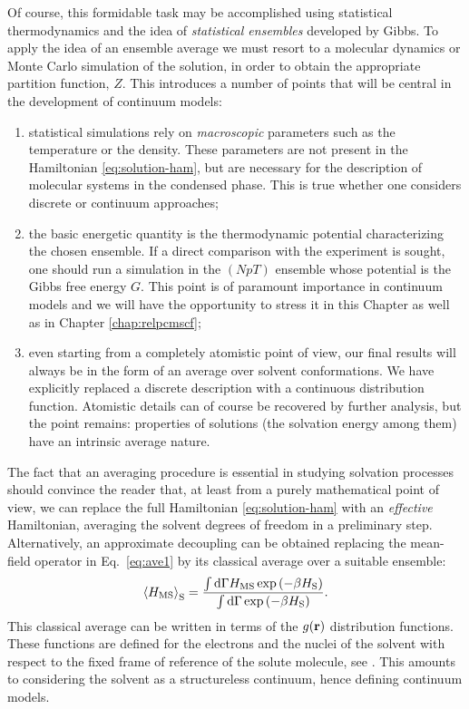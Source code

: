 Of course, this formidable task may be accomplished using statistical
thermodynamics and the idea of \emph{statistical ensembles} developed by
Gibbs. To apply the idea of an ensemble average we must resort to a
molecular dynamics or Monte Carlo simulation of the solution, in order
to obtain the appropriate partition function, $Z$. This introduces a
number of points that will be central in the development of continuum
models:
\begin{enumerate}
 \item statistical simulations rely on \emph{macroscopic} parameters
   such as the temperature or the density. These parameters are not
   present in the Hamiltonian \eqref{eq:solution-ham}, but are necessary
   for the description of molecular systems in the condensed phase. This
   is true whether one considers discrete or continuum approaches;
 \item the basic energetic quantity is the thermodynamic potential
   characterizing the chosen ensemble. If a direct comparison with the
   experiment is sought, one should run a simulation in the $(NpT)$
   ensemble whose potential is the Gibbs free energy $G$. This point is
   of paramount importance in continuum models and we will have the
   opportunity to stress it in this Chapter as well as in Chapter
   \ref{chap:relpcmscf};
 \item even starting from a completely atomistic point of view, our
   final results will always be in the form of an average over solvent
   conformations. We have explicitly replaced a discrete description
   with a continuous distribution function. Atomistic details can of
   course be recovered by further analysis, but the point remains:
   properties of solutions (the solvation energy among them) have an
   intrinsic average nature.
\end{enumerate}

The fact that an averaging procedure is essential in studying solvation
processes should convince the reader that, at least from a purely
mathematical point of view, we can replace the full Hamiltonian
\eqref{eq:solution-ham} with an \emph{effective} Hamiltonian, averaging
the solvent degrees of freedom in a preliminary
step.~\autocite{Angyan1992-vo, Tapia1992-pu}
Alternatively, an approximate decoupling can be obtained replacing the
mean-field operator in Eq.~\eqref{eq:ave1} by its classical average over
a suitable ensemble:
\begin{equation}\label{eq:ave_classic}
 \Braket{H_\mathrm{MS}}_\mathrm{S} = \frac{\int\mathop{}\!\mathrm{d}\Gamma H_\mathrm{MS}\exp
\left(-\beta H_\mathrm{S}\right)}{\int\mathop{}\!\mathrm{d}\Gamma\exp\left(-\beta H_\mathrm{S}\right)}.
\end{equation}
This classical average can be written in terms of the $g(\mathbf{r})$ distribution functions. These functions are defined
for the electrons and the nuclei of the solvent with respect to the fixed frame of reference of the solute molecule, see .
This amounts to considering the solvent as a structureless continuum, hence defining continuum models.


